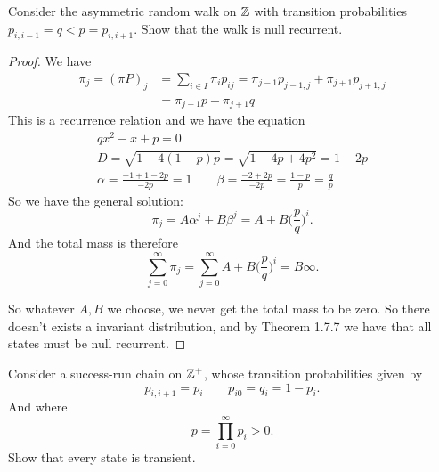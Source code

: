 \begin{thm}[Example 1.7.10]
Consider the asymmetric random walk on \(\Bbb{Z}\) with transition probabilities
\(p_{i,i-1}=q<p=p_{i,i+1}\). Show that the walk is null recurrent.
\end{thm}

\begin{proof}
We have
\begin{align*}
\pi _{j}=(\pi P)_{j}&=\sum _{i\in I}\pi _{i}p_{ij}=\pi _{j-1}p_{j-1,j}+\pi _{j+1}p_{j+1,j} \\
&=\pi _{j-1}p+\pi _{j+1}q
\end{align*}
This is a recurrence relation and we have the equation
\begin{gather*}
qx^2-x+p=0  \\
D=\sqrt {1-4(1-p)p}=\sqrt {1-4p+4p^2}=1-2p \\
\alpha =\frac{-1+1-2p}{-2p}=1 \qquad \beta =\frac{-2+2p}{-2p}=\frac{1-p}{p}=\frac{q}{p}
\end{gather*}
So we have the general solution:
\[
\pi _{j}=A\alpha ^j+B\beta ^j=A+B\Big(\frac{p}{q}\Big)^i.
\]
And the total mass is therefore
\[
\sum _{j=0}^\infty \pi _{j}=\sum _{j=0}^\infty A+B\Big(\frac{p}{q}\Big)^i=B\infty .
\]

So whatever \(A,B\) we choose, we never get the total mass to be zero. So there doesn't exists a invariant distribution, and by Theorem 1.7.7 we have that all states must be null recurrent.

\end{proof}

\begin{thm}[Example 1.7.11]
Consider a success-run chain on \(\Bbb{Z}^+\), whose transition probabilities given by
\[
p_{i,i+1}=p_{i} \qquad p_{i0}=q_{i}=1-p_{i}.
\]
And where
\[
p=\prod _{i=0}^\infty p_{i}>0.
\]
Show that every state is transient.
\end{thm}

